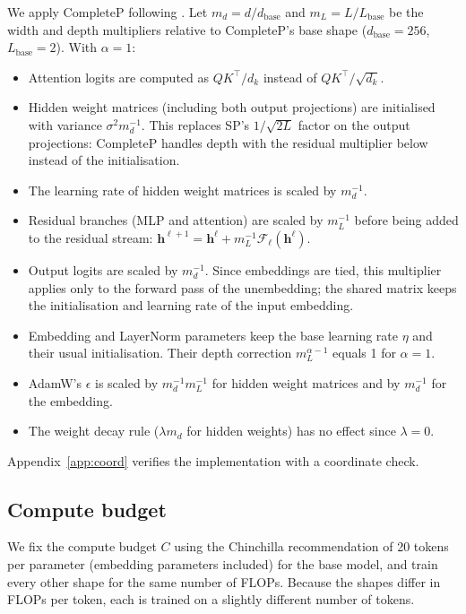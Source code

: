 \documentclass[10pt,twocolumn,a4paper]{article}
\newcommand{\vect}[1]{\bm{#1}}
\begin{document}
We apply CompleteP following \citet{dey2025completep}. Let $m_d = d/d_\text{base}$ and $m_L = L/L_\text{base}$ be the width and depth multipliers relative to CompleteP's base shape ($d_\text{base} = 256$, $L_\text{base} = 2$). With $\alpha = 1$:
\begin{itemize}[leftmargin=*,itemsep=1pt]
    \item Attention logits are computed as $QK^\top / d_k$ instead of $QK^\top / \sqrt{d_k}$.
    \item Hidden weight matrices (including both output projections) are initialised with variance $\sigma^2 m_d^{-1}$. This replaces SP's $1/\sqrt{2L}$ factor on the output projections: CompleteP handles depth with the residual multiplier below instead of the initialisation.
    \item The learning rate of hidden weight matrices is scaled by $m_d^{-1}$.
    \item Residual branches (MLP and attention) are scaled by $m_L^{-1}$ before being added to the residual stream: $\vect{h}^{\ell+1} = \vect{h}^\ell + m_L^{-1} \mathcal{F}_\ell(\vect{h}^\ell)$.
    \item Output logits are scaled by $m_d^{-1}$. Since embeddings are tied, this multiplier applies only to the forward pass of the unembedding; the shared matrix keeps the initialisation and learning rate of the input embedding.
    \item Embedding and LayerNorm parameters keep the base learning rate $\eta$ and their usual initialisation. Their depth correction $m_L^{\alpha - 1}$ equals 1 for $\alpha = 1$.
    \item AdamW's $\epsilon$ is scaled by $m_d^{-1} m_L^{-1}$ for hidden weight matrices and by $m_d^{-1}$ for the embedding.
    \item The weight decay rule ($\lambda m_d$ for hidden weights) has no effect since $\lambda = 0$.
\end{itemize}
Appendix~\ref{app:coord} verifies the implementation with a coordinate check.

\subsection{Compute budget}

We fix the compute budget $C$ using the Chinchilla \citep{hoffmann2022training} recommendation of 20 tokens per parameter (embedding parameters included) for the base model, and train every other shape for the same number of FLOPs. Because the shapes differ in FLOPs per token, each is trained on a slightly different number of tokens.
\end{document}
